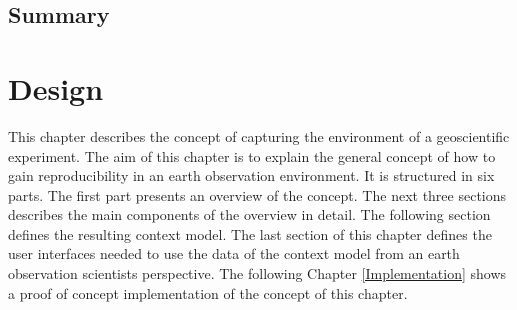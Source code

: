 \documentclass[draft,final]{vutinfth} %
\begin{document}

\section{Summary}


 
\chapter{Design}\label{Design}
This chapter describes the concept of capturing the environment of a geoscientific experiment. The aim of this chapter is to explain the general concept of how to gain reproducibility in an earth observation environment. It is structured in six parts. The first part presents an overview of the concept. The next three sections describes the main components of the overview in detail. The following section defines the resulting context model. The last section of this chapter defines the user interfaces needed to use the data of the context model from an earth observation scientists perspective. The following Chapter \ref{Implementation} shows a proof of concept implementation of the concept of this chapter. 
\end{document}
